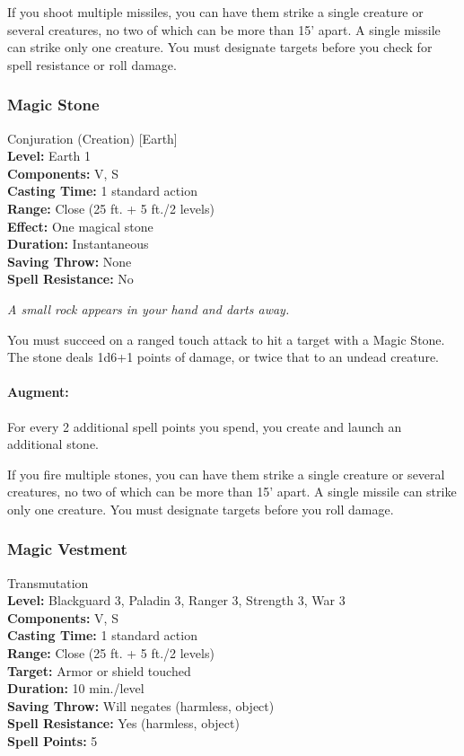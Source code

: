 If you shoot multiple missiles, you can have them strike a single creature or several creatures, no two of which can be more than 15' apart.
A single missile can strike only one creature. You must designate targets before you check for spell resistance or roll damage.
\subsubsection{Magic Stone}
\label{Spell:MagicStone}
Conjuration (Creation) [Earth]
\\ \textbf{Level:} Earth 1
\\ \textbf{Components:} V, S
\\ \textbf{Casting Time:} 1 standard action
\\ \textbf{Range:} Close (25 ft. + 5 ft./2 levels)
\\ \textbf{Effect:} One magical stone
\\ \textbf{Duration:} Instantaneous
\\ \textbf{Saving Throw:} None
\\ \textbf{Spell Resistance:} No

\emph{A small rock appears in your hand and darts away.}

You must succeed on a ranged touch attack to hit a target with a Magic Stone.
The stone deals 1d6+1 points of damage, or twice that to an undead creature.

\paragraph{Augment:} For every 2 additional spell points you spend, you create and launch an additional stone.

If you fire multiple stones, you can have them strike a single creature or several creatures, no two of which can be more than 15' apart.
A single missile can strike only one creature. You must designate targets before you roll damage.
\subsubsection{Magic Vestment}
\label{Spell:MagicVestment}
Transmutation
\\ \textbf{Level:} Blackguard 3, Paladin 3, Ranger 3, Strength 3, War 3
\\ \textbf{Components:} V, S
\\ \textbf{Casting Time:} 1 standard action
\\ \textbf{Range:} Close (25 ft. + 5 ft./2 levels)
\\ \textbf{Target:} Armor or shield touched
\\ \textbf{Duration:} 10 min./level
\\ \textbf{Saving Throw:} Will negates (harmless, object)
\\ \textbf{Spell Resistance:} Yes (harmless, object)
\\ \textbf{Spell Points:} 5

